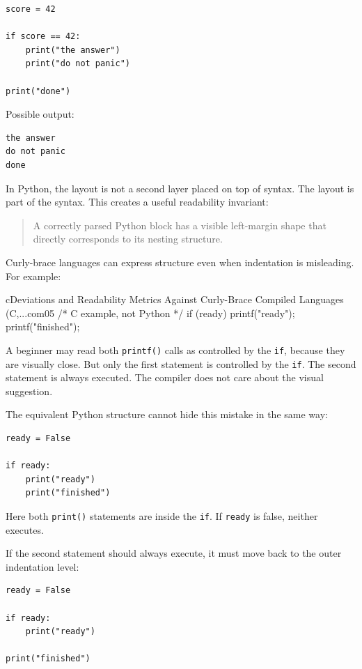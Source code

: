 \documentclass[a4paper,twoside]{report}
\begin{document}
\begin{verbatim}
score = 42

if score == 42:
    print("the answer")
    print("do not panic")

print("done")
\end{verbatim}

Possible output:

\begin{verbatim}
the answer
do not panic
done
\end{verbatim}

In Python, the layout is not a second layer placed on top of syntax. The layout is part of the syntax. This creates a useful readability invariant:

\begin{quote}
A correctly parsed Python block has a visible left-margin shape that directly corresponds to its nesting structure.
\end{quote}

Curly-brace languages can express structure even when indentation is misleading. For example:

\begin{codebox}[]{c}{Deviations and Readability Metrics Against Curly-Brace Compiled Languages (C,...}{com05}
/* C example, not Python */
if (ready)
    printf("ready\n");
    printf("finished\n");
\end{codebox}


A beginner may read both \texttt{printf()} calls as controlled by the \texttt{if}, because they are visually close. But only the first statement is controlled by the \texttt{if}. The second statement is always executed. The compiler does not care about the visual suggestion.

The equivalent Python structure cannot hide this mistake in the same way:

\begin{verbatim}
ready = False

if ready:
    print("ready")
    print("finished")
\end{verbatim}

Here both \texttt{print()} statements are inside the \texttt{if}. If \texttt{ready} is false, neither executes.

If the second statement should always execute, it must move back to the outer indentation level:

\begin{verbatim}
ready = False

if ready:
    print("ready")

print("finished")
\end{verbatim}
\end{document}
